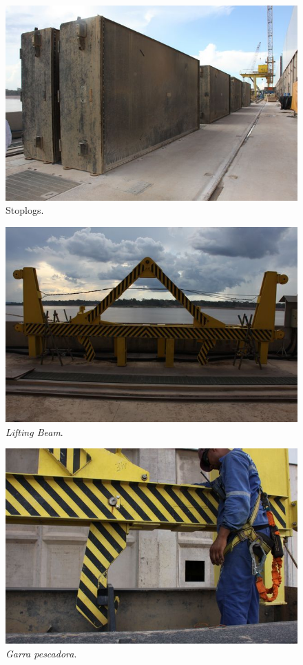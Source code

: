 \begin{figure}[H]
    \centering
    \includegraphics[width=0.9\columnwidth]{figs/nomenclatura/1.jpg}
    \caption{Stoplogs.}
    \label{nomenclatura_1}
\end{figure}

\begin{figure}[H]
    \centering
    \includegraphics[width=0.9\columnwidth]{figs/nomenclatura/2.jpg}
    \caption{\emph{Lifting Beam}.}
    \label{nomenclatura_2}
\end{figure}


\begin{figure}[H]
    \centering
    \includegraphics[width=0.9\columnwidth]{figs/nomenclatura/4.jpg}
    \caption{\emph{Garra pescadora}.}
    \label{nomenclatura_4}
\end{figure}

